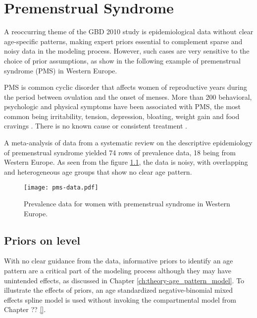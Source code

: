 \chapter{Premenstrual Syndrome}
\label{applications-priors_knots_select}

A reoccurring theme of the GBD 2010 study is epidemiological data without clear age-specific patterns, making expert priors essential to complement sparse and noisy data in the modeling process.  However, such cases are very sensitive to the choice of prior assumptions, as show in the following example of premenstrual syndrome (PMS) in Western Europe.

PMS is common cyclic disorder that affects women of reproductive years during the period between ovulation and the onset of menses.  More than 200 behavioral, psychologic and physical symptoms have been associated with PMS, the most common being irritability, tension, depression, bloating, weight gain and food cravings \cite{dickerson_premenstrual_2003, singh_incidence_1998}.  There is no known cause or consistent treatment \cite{goodale_alleviation_1990}.

A meta-analysis of data from a systematic review on the descriptive epidemiology of premenstrual syndrome yielded 74 rows of prevalence data, 18 being from Western Europe.  As seen from the figure \ref{fig:app-pms_data}, the data is noisy, with overlapping and heterogeneous age groups that show no clear age pattern.

    \begin{figure}[h]
        \begin{center}
            \texttt{[image: pms-data.pdf]}
            \caption{Prevalence data for women with premenstrual syndrome in Western Europe.}
        \end{center}
        \label{fig:app-pms_data}
    \end{figure}

\section{Priors on level} \label{sec:app-priors on level}
With no clear guidance from the data, informative priors to identify an age pattern are a critical part of the modeling process although they may have unintended effects, as discussed in Chapter \ref{ch:theory-age_pattern_model}.  To illustrate the effects of priors, an age standardized negative-binomial mixed effects spline model is used without invoking the compartmental model from Chapter ?? \ref{}.

